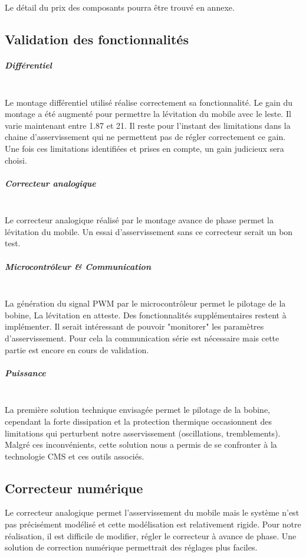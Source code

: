 \documentclass[11pt, french]{article} %
\begin{document}
Le détail du prix des composants pourra être trouvé en annexe. 

\subsection{Validation des fonctionnalités}

\subparagraph{Différentiel}~\\
Le montage différentiel utilisé réalise correctement sa fonctionnalité. Le gain du montage a été augmenté pour permettre la lévitation du mobile avec le leste. Il varie maintenant entre 1.87 et 21. Il reste pour l'instant des limitations dans la chaine d'asservissement qui ne permettent pas de régler correctement ce gain. Une fois ces limitations identifiées et prises en compte, un gain judicieux sera choisi.

\subparagraph{Correcteur analogique}~\\
Le correcteur analogique réalisé par le montage avance de phase permet la lévitation du mobile. Un essai d'asservissement sans ce correcteur serait un bon test.

\subparagraph{Microcontrôleur \& Communication}~\\
La génération du signal PWM par le microcontrôleur permet le pilotage de la bobine, La lévitation en atteste. Des fonctionnalités supplémentaires restent à implémenter. Il serait intéressant de pouvoir "monitorer" les paramètres d'asservissement. Pour cela la communication série est nécessaire mais cette partie est encore en cours de validation.

\subparagraph{Puissance}~\\
La première solution technique envisagée permet le pilotage de la bobine, cependant la forte dissipation et la protection thermique occasionnent des limitations qui perturbent notre asservissement (oscillations, tremblements). Malgré ces inconvénients, cette solution nous a permis de se confronter à la technologie CMS et ces outils associés.

\subsection{Correcteur numérique}
Le correcteur analogique permet l'asservissement du mobile mais le système n'est pas précisément modélisé et cette modélisation est relativement rigide. Pour notre réalisation, il est difficile de modifier, régler le correcteur à avance de phase.
Une solution de correction numérique permettrait des réglages plus faciles.
\end{document}
